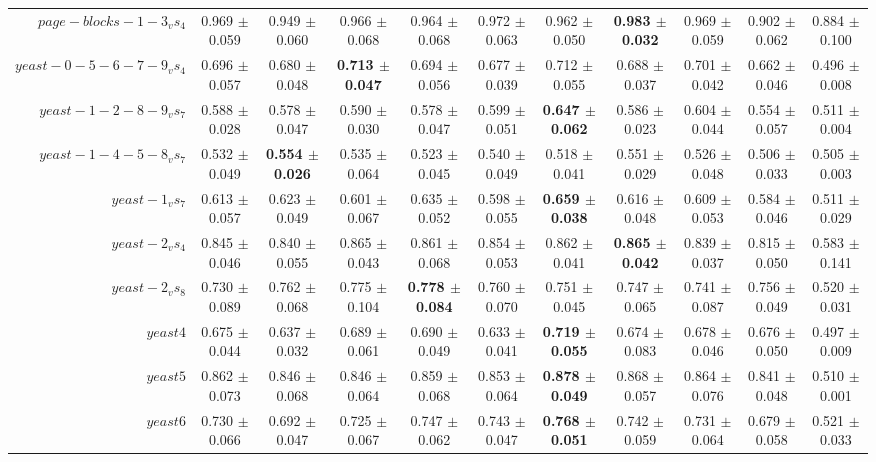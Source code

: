 \begin{table}[!ht]
{\begin{tabular}{r c c c c c c c c c c}
$page-blocks-1-3_vs_4$ & 0.969 $\pm$ 0.059 & 0.949 $\pm$ 0.060 & 0.966 $\pm$ 0.068 & 0.964 $\pm$ 0.068 & 0.972 $\pm$ 0.063 & 0.962 $\pm$ 0.050 & \textbf{0.983 $\pm$ 0.032} & 0.969 $\pm$ 0.059 & 0.902 $\pm$ 0.062 & 0.884 $\pm$ 0.100 \\
$yeast-0-5-6-7-9_vs_4$ & 0.696 $\pm$ 0.057 & 0.680 $\pm$ 0.048 & \textbf{0.713 $\pm$ 0.047} & 0.694 $\pm$ 0.056 & 0.677 $\pm$ 0.039 & 0.712 $\pm$ 0.055 & 0.688 $\pm$ 0.037 & 0.701 $\pm$ 0.042 & 0.662 $\pm$ 0.046 & 0.496 $\pm$ 0.008 \\
$yeast-1-2-8-9_vs_7$ & 0.588 $\pm$ 0.028 & 0.578 $\pm$ 0.047 & 0.590 $\pm$ 0.030 & 0.578 $\pm$ 0.047 & 0.599 $\pm$ 0.051 & \textbf{0.647 $\pm$ 0.062} & 0.586 $\pm$ 0.023 & 0.604 $\pm$ 0.044 & 0.554 $\pm$ 0.057 & 0.511 $\pm$ 0.004 \\
$yeast-1-4-5-8_vs_7$ & 0.532 $\pm$ 0.049 & \textbf{0.554 $\pm$ 0.026} & 0.535 $\pm$ 0.064 & 0.523 $\pm$ 0.045 & 0.540 $\pm$ 0.049 & 0.518 $\pm$ 0.041 & 0.551 $\pm$ 0.029 & 0.526 $\pm$ 0.048 & 0.506 $\pm$ 0.033 & 0.505 $\pm$ 0.003 \\
$yeast-1_vs_7$ & 0.613 $\pm$ 0.057 & 0.623 $\pm$ 0.049 & 0.601 $\pm$ 0.067 & 0.635 $\pm$ 0.052 & 0.598 $\pm$ 0.055 & \textbf{0.659 $\pm$ 0.038} & 0.616 $\pm$ 0.048 & 0.609 $\pm$ 0.053 & 0.584 $\pm$ 0.046 & 0.511 $\pm$ 0.029 \\
$yeast-2_vs_4$ & 0.845 $\pm$ 0.046 & 0.840 $\pm$ 0.055 & 0.865 $\pm$ 0.043 & 0.861 $\pm$ 0.068 & 0.854 $\pm$ 0.053 & 0.862 $\pm$ 0.041 & \textbf{0.865 $\pm$ 0.042} & 0.839 $\pm$ 0.037 & 0.815 $\pm$ 0.050 & 0.583 $\pm$ 0.141 \\
$yeast-2_vs_8$ & 0.730 $\pm$ 0.089 & 0.762 $\pm$ 0.068 & 0.775 $\pm$ 0.104 & \textbf{0.778 $\pm$ 0.084} & 0.760 $\pm$ 0.070 & 0.751 $\pm$ 0.045 & 0.747 $\pm$ 0.065 & 0.741 $\pm$ 0.087 & 0.756 $\pm$ 0.049 & 0.520 $\pm$ 0.031 \\
$yeast4$ & 0.675 $\pm$ 0.044 & 0.637 $\pm$ 0.032 & 0.689 $\pm$ 0.061 & 0.690 $\pm$ 0.049 & 0.633 $\pm$ 0.041 & \textbf{0.719 $\pm$ 0.055} & 0.674 $\pm$ 0.083 & 0.678 $\pm$ 0.046 & 0.676 $\pm$ 0.050 & 0.497 $\pm$ 0.009 \\
$yeast5$ & 0.862 $\pm$ 0.073 & 0.846 $\pm$ 0.068 & 0.846 $\pm$ 0.064 & 0.859 $\pm$ 0.068 & 0.853 $\pm$ 0.064 & \textbf{0.878 $\pm$ 0.049} & 0.868 $\pm$ 0.057 & 0.864 $\pm$ 0.076 & 0.841 $\pm$ 0.048 & 0.510 $\pm$ 0.001 \\
$yeast6$ & 0.730 $\pm$ 0.066 & 0.692 $\pm$ 0.047 & 0.725 $\pm$ 0.067 & 0.747 $\pm$ 0.062 & 0.743 $\pm$ 0.047 & \textbf{0.768 $\pm$ 0.051} & 0.742 $\pm$ 0.059 & 0.731 $\pm$ 0.064 & 0.679 $\pm$ 0.058 & 0.521 $\pm$ 0.033 \\

\end{tabular}}
\end{table}
